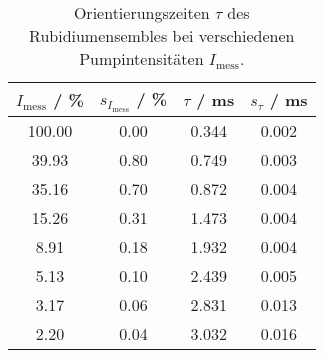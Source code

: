 \begin{table}[H]
\caption{Orientierungszeiten $\tau$ des Rubidiumensembles bei verschiedenen Pumpintensitäten $I_{\text{mess}}$.}
\begin{center}
\begin{tabular}{|c|c|c|c|}
  \hline
  $I_\text{mess}$ / \% & $s_{I_\text{mess}}$ / \% & $\tau$ / ms & $s_\tau$ / ms \\ \hline
  100.00 & 0.00 & 0.344 & 0.002 \\ \hline
  39.93 & 0.80 & 0.749 & 0.003 \\ \hline
  35.16 & 0.70 & 0.872 & 0.004 \\ \hline
  15.26 & 0.31 & 1.473 & 0.004 \\ \hline
  8.91 & 0.18 & 1.932 & 0.004 \\ \hline
  5.13 & 0.10 & 2.439 & 0.005 \\ \hline
  3.17 & 0.06 & 2.831 & 0.013 \\ \hline
  2.20 & 0.04 & 3.032 & 0.016 \\ \hline
\end{tabular}
\end{center}
\label{tab:deh:fitres}
\end{table}
